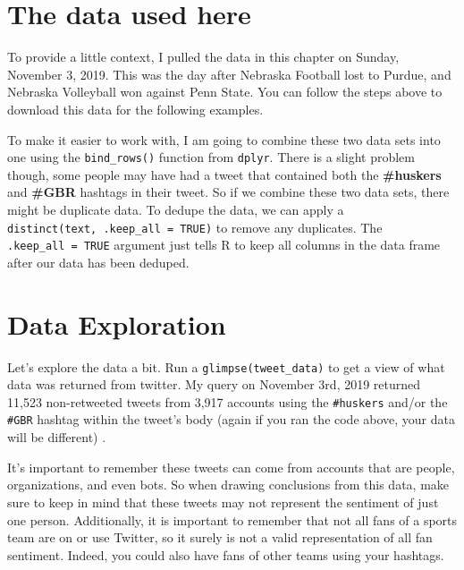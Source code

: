 \documentclass[
]{book}
\newenvironment{Shaded}{\begin{snugshade}}{\end{snugshade}}
\newcommand{\DataTypeTok}[1]{\textcolor[rgb]{0.13,0.29,0.53}{#1}}
\newcommand{\KeywordTok}[1]{\textcolor[rgb]{0.13,0.29,0.53}{\textbf{#1}}}
\newcommand{\NormalTok}[1]{#1}
\newcommand{\OperatorTok}[1]{\textcolor[rgb]{0.81,0.36,0.00}{\textbf{#1}}}
\newcommand{\OtherTok}[1]{\textcolor[rgb]{0.56,0.35,0.01}{#1}}
\newcommand{\StringTok}[1]{\textcolor[rgb]{0.31,0.60,0.02}{#1}}
\begin{document}
\hypertarget{the-data-used-here}{%
\section{The data used here}\label{the-data-used-here}}

To provide a little context, I pulled the data in this chapter on Sunday, November 3, 2019. This was the day after Nebraska Football lost to Purdue, and Nebraska Volleyball won against Penn State. You can follow the steps above to download this data for the following examples.

To make it easier to work with, I am going to combine these two data sets into one using the \texttt{bind\_rows()} function from \texttt{dplyr}. There is a slight problem though, some people may have had a tweet that contained both the \textbf{\#huskers} and \textbf{\#GBR} hashtags in their tweet. So if we combine these two data sets, there might be duplicate data. To dedupe the data, we can apply a \texttt{distinct(text,\ .keep\_all\ =\ TRUE)} to remove any duplicates. The \texttt{.keep\_all\ =\ TRUE} argument just tells R to keep all columns in the data frame after our data has been deduped.

\begin{Shaded}
\end{Shaded}

\hypertarget{data-exploration}{%
\section{Data Exploration}\label{data-exploration}}

Let's explore the data a bit. Run a \texttt{glimpse(tweet\_data)} to get a view of what data was returned from twitter. My query on November 3rd, 2019 returned 11,523 non-retweeted tweets from 3,917 accounts using the \texttt{\#huskers} and/or the \texttt{\#GBR} hashtag within the tweet's body (again if you ran the code above, your data will be different) .

It's important to remember these tweets can come from accounts that are people, organizations, and even bots. So when drawing conclusions from this data, make sure to keep in mind that these tweets may not represent the sentiment of just one person. Additionally, it is important to remember that not all fans of a sports team are on or use Twitter, so it surely is not a valid representation of all fan sentiment. Indeed, you could also have fans of other teams using your hashtags.
\end{document}

